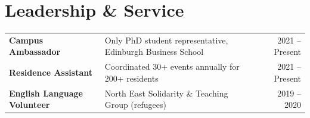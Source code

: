\section{Leadership \& Service}

\begin{tabularx}{\linewidth}{@{}l X r@{}}
\textbf{Campus Ambassador} & Only PhD student representative, Edinburgh Business School & 2021 -- Present \\
\textbf{Residence Assistant} & Coordinated 30+ events annually for 200+ residents & 2021 -- Present \\
\textbf{English Language Volunteer} & North East Solidarity \& Teaching Group (refugees) & 2019 -- 2020 \\
\end{tabularx}
